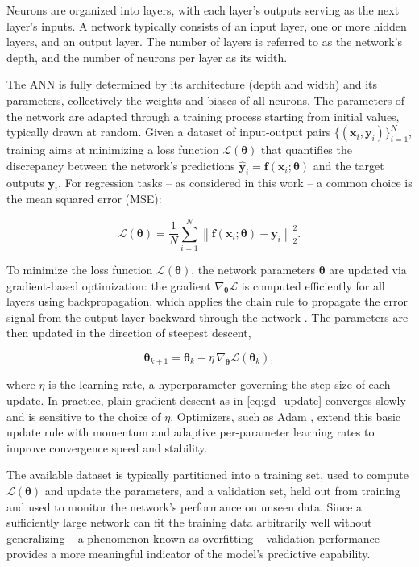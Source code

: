 Neurons are organized into layers, with each layer's outputs serving as the next layer's inputs. A network typically consists of an input layer, one or more hidden layers, and an output layer. The number of layers is referred to as the network's depth, and the number of neurons per layer as its width.

The ANN is fully determined by its architecture (depth and width) and
its parameters, collectively the weights and biases of all neurons. The parameters of the network are adapted through a training process starting from initial values, typically drawn at random. Given a dataset of input-output pairs $\{(\bm{x}_i, \bm{y}_i)\}_{i=1}^{N}$, training aims at minimizing a loss function $\mathcal{L}(\bm{\theta})$ that quantifies the discrepancy between the network's predictions $\hat{\bm{y}}_i = \bm{f}(\bm{x}_i; \bm{\theta})$ and the target outputs $\bm{y}_i$.
For regression tasks -- as considered in this work -- a common choice is the mean squared error (MSE):

\begin{equation}
	\mathcal{L}(\bm{\theta}) = \frac{1}{N} \sum_{i=1}^{N} \left\lVert \bm{f}(\bm{x}_i; \bm{\theta}) - \bm{y}_i \right\rVert_2^2.
	\label{eq:mse_loss}
\end{equation}

To minimize the loss function $\mathcal{L}(\bm{\theta})$, the network parameters $\bm{\theta}$ are updated via gradient-based optimization: the gradient $\nabla_{\bm{\theta}} \mathcal{L}$ is computed efficiently for all layers using backpropagation, which applies the chain rule to propagate the error signal from the output layer backward through the network \cite{Rumelhart1986Backprop}. The parameters are then updated in the direction of steepest descent,

\begin{equation}
	\bm{\theta}_{k+1} = \bm{\theta}_k - \eta \, \nabla_{\bm{\theta}} \mathcal{L}(\bm{\theta}_k),
	\label{eq:gd_update}
\end{equation}

where $\eta$ is the learning rate, a hyperparameter governing the step size of each update.
In practice, plain gradient descent as in \eqref{eq:gd_update} converges slowly and is sensitive to the choice of $\eta$. Optimizers, such as Adam \cite{Kingma2014Adam}, extend this basic update rule with momentum and adaptive per-parameter learning rates to improve convergence speed and stability.

The available dataset is typically partitioned into a training set, used to compute $\mathcal{L}(\bm{\theta})$ and update the parameters, and a validation set, held out from training and used to monitor the network's performance on unseen data. Since a sufficiently large network can fit the training data arbitrarily well without generalizing -- a phenomenon known as overfitting -- validation performance provides a more meaningful indicator of the model's predictive capability.

